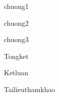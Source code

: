 \documentclass[12pt, a4paper, reqno, oneside]{book}
\begin{document}





\makeatletter
\renewcommand{\ps@myheadings}{
\renewcommand{\@oddhead}{\textsf{Các mô hình ngẫu nhiên và ứng dụng}\hfil\textrm{\thepage}}
\renewcommand{\@oddfoot}{\textsf{KSTN Toán Tin K61 - Viện Toán ứng dụng và Tin học}\hfil}
}
\makeatother 

\newpage


\tableofcontents

\newpage


\newpage
 {chuong1}

\newpage
 {chuong2}

\newpage
 {chuong3}



\newpage
 {Tongket}

\newpage
 {Ketluan}

\newpage
 {Tailieuthamkhao}
\end{document}
